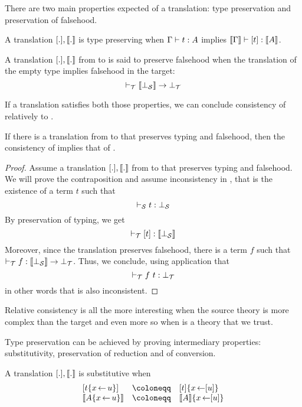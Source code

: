 There are two main properties expected of a translation: type preservation
and preservation of falsehood.

\begin{definition}
  A translation \([.], \llbracket . \rrbracket\) is type preserving when
  \(\Gamma \vdash t : A\) implies \(\llbracket \Gamma \rrbracket \vdash [t] : \llbracket A \rrbracket\).
\end{definition}

\begin{definition}
  A translation \([.], \llbracket . \rrbracket\) from \cS to \cT is said to preserve
  falsehood when the translation of the empty type implies falsehood in the
  target:
  \[ \vdash_\mathcal{T} \llbracket \bot_\mathcal{S} \rrbracket \to \bot_\mathcal{T} \]
\end{definition}

If a translation satisfies both those properties, we can conclude consistency
of \cS relatively to \cT.

\begin{theorem}
  If there is a translation from \cS to \cT that preserves typing and
  falsehood, then the consistency of \cT implies that of \cS.
\end{theorem}

\begin{proof}
  Assume a translation \([.], \llbracket . \rrbracket\) from \cS to \cT that preserves typing
  and falsehood. We will prove the contraposition and assume inconsistency in
  \cS, that is the existence of a term \(t\) such that
  \[ \vdash_\mathcal{S} t : \bot_\mathcal{S} \]
  By preservation of typing, we get
  \[ \vdash_\mathcal{T} [t] : \llbracket \bot_\mathcal{S} \rrbracket \]
  Moreover, since the translation preserves falsehood, there is a term \(f\)
  such that \(\vdash_\mathcal{T} f : \llbracket \bot_\mathcal{S} \rrbracket \to \bot_\mathcal{T}\).
  Thus, we conclude, using application that
  \[ \vdash_\mathcal{T} f\ t : \bot_\mathcal{T} \]
  in other words that \cT is also inconsistent.
\end{proof}

Relative consistency is all the more interesting when the source theory is more
complex than the target and even more so when \cT is a theory that we trust.

Type preservation can be achieved by proving intermediary properties:
substitutivity, preservation of reduction and of conversion.

\begin{definition}[Substitutivity]
  A translation \([.], \llbracket . \rrbracket\) is substitutive when
  \[
    \begin{array}{lcl}
      [t\{x \sto u\}] &\coloneqq& [t]\{x \sto [u]\} \\
      \transl{A\{x \sto u\}} &\coloneqq& \transl{A}\{x \sto [u]\} \\
    \end{array}
  \]
\end{definition}

